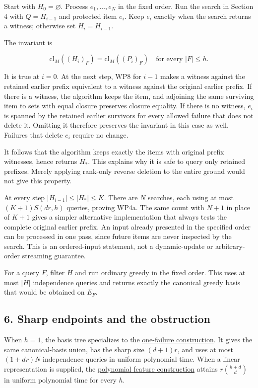 Start with \(H_0=\varnothing\). Process \(e_1,\ldots,e_N\) in the fixed order. Run the search in Section 4 with \(Q=H_{i-1}\) and protected item \(e_i\). Keep \(e_i\) exactly when the search returns a witness; otherwise set \(H_i=H_{i-1}\).

The invariant is

\[
\mathrm{cl}_M((H_i)_F)
 =\mathrm{cl}_M((P_i)_F)
\quad\text{for every }|F|\le h.
\tag{WP8}
\]

It is true at \(i=0\). At the next step, WP8 for \(i-1\) makes a witness against the retained earlier prefix equivalent to a witness against the original earlier prefix. If there is a witness, the algorithm keeps the item, and adjoining the same surviving item to sets with equal closure preserves closure equality. If there is no witness, \(e_i\) is spanned by the retained earlier survivors for every allowed failure that does not delete it. Omitting it therefore preserves the invariant in this case as well. Failures that delete \(e_i\) require no change.

It follows that the algorithm keeps exactly the items with original prefix witnesses, hence returns \(H_*\). This explains why it is safe to query only retained prefixes. Merely applying rank-only reverse deletion to the entire ground would not give this property.

At every step \(|H_{i-1}|\le |H_*|\le K\). There are \(N\) searches, each using at most \((K+1)S(dr,h)\) queries, proving WP4a. The same count with \(N+1\) in place of \(K+1\) gives a simpler alternative implementation that always tests the complete original earlier prefix. An input already presented in the specified order can be processed in one pass, since future items are never inspected by the search. This is an ordered-input statement, not a dynamic-update or arbitrary-order streaming guarantee.

For a query \(F\), filter \(H\) and run ordinary greedy in the fixed order. This uses at most \(|H|\) independence queries and returns exactly the canonical greedy basis that would be obtained on \(E_F\).

\hypertarget{af-eb38c0014f-sharp-endpoints-and-the-obstruction}{%
\subsection{6. Sharp endpoints and the obstruction}\label{af-eb38c0014f-sharp-endpoints-and-the-obstruction}}

When \(h=1\), the basis tree specializes to the \href{https://github.com/icekylinx/algorithm-frontier/blob/main/problems/matroid-failure-summaries/manuscripts/arbitrary-matroid-and-submodular-failure-summaries.md\#7-weighted-oracle-summaries-for-one-label-failure}{one-failure construction}. It gives the same canonical-basis union, has the sharp size \((d+1)r\), and uses at most \((1+dr)N\) independence queries in uniform polynomial time. When a linear representation is supplied, the \href{https://github.com/icekylinx/algorithm-frontier/blob/main/problems/matroid-failure-summaries/manuscripts/sharp-represented-matroid-failure-summaries.md}{polynomial feature construction} attains \(r\binom{h+d}{d}\) in uniform polynomial time for every \(h\).

